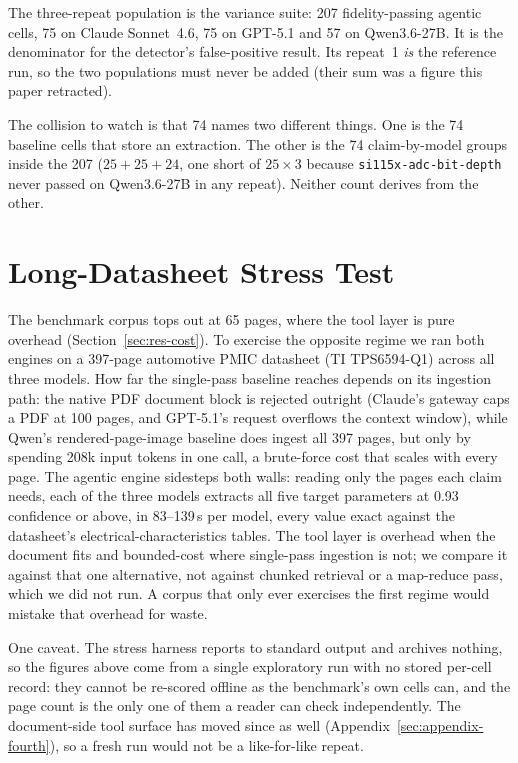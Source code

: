 \documentclass[11pt]{article}
\begin{document}
The three-repeat population is the variance suite: 207 fidelity-passing
agentic cells, 75 on Claude Sonnet~4.6, 75 on GPT-5.1 and 57 on
Qwen3.6-27B. It is the denominator for the detector's false-positive
result. Its repeat~1 \emph{is} the reference run, so the two populations
must never be added (their sum was a figure this paper retracted).

The collision to watch is that 74 names two different things. One is
the 74 baseline cells that store an extraction. The other is the 74
claim-by-model groups inside the 207 ($25+25+24$, one short of
$25\times3$ because \texttt{si115x-adc-bit-depth} never passed on
Qwen3.6-27B in any repeat). Neither count derives from the other.

\section{Long-Datasheet Stress Test}
\label{sec:appendix-stress}

The benchmark corpus tops out at 65 pages, where the tool layer is pure
overhead (Section~\ref{sec:res-cost}). To exercise the opposite regime we
ran both engines on a 397-page automotive PMIC datasheet (TI TPS6594-Q1)
across all three models. How far the single-pass baseline reaches depends
on its ingestion path: the native PDF document block is rejected
outright (Claude's gateway caps a PDF at 100 pages, and GPT-5.1's
request overflows the context window), while Qwen's rendered-page-image
baseline does ingest all 397 pages, but only by spending 208k input
tokens in one call, a brute-force cost that scales with every page. The
agentic engine sidesteps both walls: reading only the pages each claim
needs, each of the three models extracts all five target parameters at
0.93 confidence or above, in 83--139\,s per model, every value exact
against the datasheet's electrical-characteristics tables. The tool layer is overhead
when the document fits and bounded-cost where single-pass ingestion is
not; we compare it against that one alternative, not against chunked
retrieval or a map-reduce pass, which we did not run. A corpus that only
ever exercises the first regime would mistake that overhead for waste.

One caveat. The stress harness reports to standard output and archives
nothing, so the figures above come from a single exploratory run with no
stored per-cell record: they cannot be re-scored offline as the
benchmark's own cells can, and the page count is the only one of them a
reader can check independently. The document-side tool surface has moved
since as well (Appendix~\ref{sec:appendix-fourth}), so a fresh run would
not be a like-for-like repeat.
\end{document}
